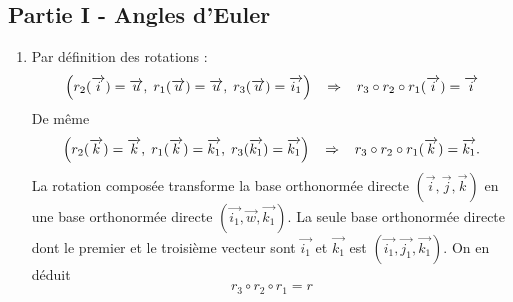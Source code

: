 \subsection*{Partie I - Angles d'Euler}
\begin{enumerate}
 \item Par définition des rotations :
\begin{displaymath}
\left( r_2(\overrightarrow{i})=\overrightarrow{u}, \;
r_1(\overrightarrow{u})=\overrightarrow{u}, \;
r_3(\overrightarrow{u})=\overrightarrow{i_1}\right) 
\hspace{0.3cm} \Rightarrow \hspace{0.3cm}
r_3 \circ r_2 \circ r_1 (\overrightarrow{i})=\overrightarrow{i}
\end{displaymath}
De même 
\begin{displaymath}
 \left( r_2(\overrightarrow{k})=\overrightarrow{k}, \;
 r_1(\overrightarrow{k})=\overrightarrow{k_1},\;
 r_3(\overrightarrow{k_1})=\overrightarrow{k_1}\right) 
 \hspace{0.3cm} \Rightarrow \hspace{0.3cm}
r_3 \circ r_2 \circ r_1 (\overrightarrow{k})=\overrightarrow{k_1}. 
\end{displaymath}
La rotation composée transforme la base orthonormée directe $(\overrightarrow{i},\overrightarrow{j},\overrightarrow{k})$ en une base orthonormée directe $(\overrightarrow{i_1},\overrightarrow{w},\overrightarrow{k_1})$. La seule base orthonormée directe dont le premier et le troisième vecteur sont $\overrightarrow{i_1}$ et $\overrightarrow{k_1}$ est $(\overrightarrow{i_1},\overrightarrow{j_1},\overrightarrow{k_1})$. On en déduit
\begin{displaymath}
 r_3 \circ r_2 \circ r_1 = r
\end{displaymath}


\end{enumerate}
